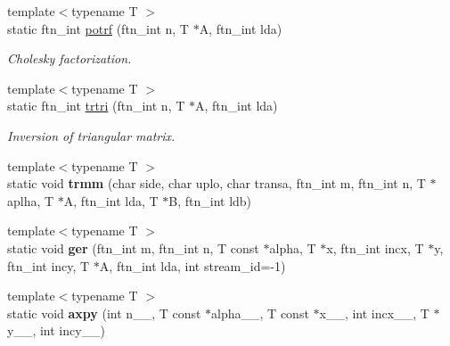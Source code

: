 \begin{DoxyCompactItemize}
\item 
{\footnotesize template$<$typename T $>$ }\\static ftn\+\_\+int \hyperlink{classsddk_1_1linalg_3_01_g_p_u_01_4_abfe72c25212cac9572262cfafbe7e3de}{potrf} (ftn\+\_\+int n, T $\ast$A, ftn\+\_\+int lda)
\begin{DoxyCompactList}\small\item\em Cholesky factorization. \end{DoxyCompactList}\item 
{\footnotesize template$<$typename T $>$ }\\static ftn\+\_\+int \hyperlink{classsddk_1_1linalg_3_01_g_p_u_01_4_ac9d8a936c08a5873dba375ae856ed0d0}{trtri} (ftn\+\_\+int n, T $\ast$A, ftn\+\_\+int lda)
\begin{DoxyCompactList}\small\item\em Inversion of triangular matrix. \end{DoxyCompactList}\item 
\hypertarget{classsddk_1_1linalg_3_01_g_p_u_01_4_af27112d5c86ccd5ef4821b7f87b846e2}{}{\footnotesize template$<$typename T $>$ }\\static void {\bfseries trmm} (char side, char uplo, char transa, ftn\+\_\+int m, ftn\+\_\+int n, T $\ast$aplha, T $\ast$A, ftn\+\_\+int lda, T $\ast$B, ftn\+\_\+int ldb)\label{classsddk_1_1linalg_3_01_g_p_u_01_4_af27112d5c86ccd5ef4821b7f87b846e2}

\item 
\hypertarget{classsddk_1_1linalg_3_01_g_p_u_01_4_addae0f8600ff1eed543dfe105bfcc562}{}{\footnotesize template$<$typename T $>$ }\\static void {\bfseries ger} (ftn\+\_\+int m, ftn\+\_\+int n, T const $\ast$alpha, T $\ast$x, ftn\+\_\+int incx, T $\ast$y, ftn\+\_\+int incy, T $\ast$A, ftn\+\_\+int lda, int stream\+\_\+id=-\/1)\label{classsddk_1_1linalg_3_01_g_p_u_01_4_addae0f8600ff1eed543dfe105bfcc562}

\item 
\hypertarget{classsddk_1_1linalg_3_01_g_p_u_01_4_a03ae9ba65443a390c5f7a1086cfe785a}{}{\footnotesize template$<$typename T $>$ }\\static void {\bfseries axpy} (int n\+\_\+\+\_\+, T const $\ast$alpha\+\_\+\+\_\+, T const $\ast$x\+\_\+\+\_\+, int incx\+\_\+\+\_\+, T $\ast$y\+\_\+\+\_\+, int incy\+\_\+\+\_\+)\label{classsddk_1_1linalg_3_01_g_p_u_01_4_a03ae9ba65443a390c5f7a1086cfe785a}

\end{DoxyCompactItemize}



